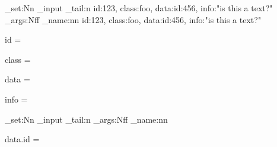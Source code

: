 \documentclass{article}
\def\readjson#1{%
  \tl_set:Nn \cdr_input { \tl_tail:n { #1 } }
  \exp_args:Nff \inside_name:nn {} { #1 }
}
\begin{document}
\makeatletter

\readjson{{id:123, class:foo, data:{id:456}, info:"is this a text?"}}

id = \json@id

class = \json@class

data = \json@data

info = \json@info

\readjson{{\json@data}}

data.id = \json@id

\makeatother
\end{document}
